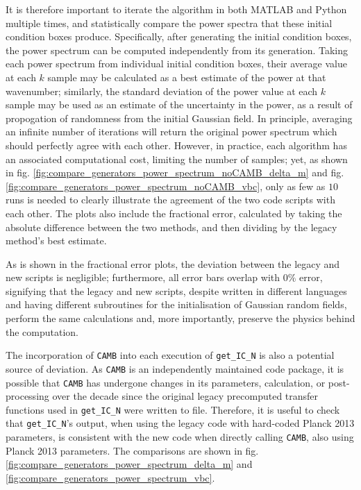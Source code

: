 \documentclass[floats,floatfix,showpacs,amssymb,prd,superscriptaddress,nofootinbib]{revtex4-2} %
\newcommand{\code}{\texttt}
\begin{document}
It is therefore important to iterate the algorithm in both MATLAB and Python multiple times, and statistically compare the power spectra that these initial condition boxes produce. Specifically, after generating the initial condition boxes, the power spectrum can be computed independently from its generation. Taking each power spectrum from individual initial condition boxes, their average value at each $k$ sample may be calculated as a best estimate of the power at that wavenumber; similarly, the standard deviation of the power value at each $k$ sample may be used as an estimate of the uncertainty in the power, as a result of propogation of randomness from the initial Gaussian field. In principle, averaging an infinite number of iterations will return the original power spectrum which should perfectly agree with each other. However, in practice, each algorithm has an associated computational cost, limiting the number of samples; yet, as shown in fig. \ref{fig:compare_generators_power_spectrum_noCAMB_delta_m} and fig. \ref{fig:compare_generators_power_spectrum_noCAMB_vbc}, only as few as $10$ runs is needed to clearly illustrate the agreement of the two code scripts with each other. The plots also include the fractional error, calculated by taking the absolute difference between the two methods, and then dividing by the legacy method's best estimate.

As is shown in the fractional error plots, the deviation between the legacy and new scripts is negligible; furthermore, all error bars overlap with $0 \%$ error, signifying that the legacy and new scripts, despite written in different languages and having different subroutines for the initialisation of Gaussian random fields, perform the same calculations and, more importantly, preserve the physics behind the computation.

The incorporation of \code{CAMB} into each execution of \code{get\_IC\_N} is also a potential source of deviation. As \code{CAMB} is an independently maintained code package, it is possible that \code{CAMB} has undergone changes in its parameters, calculation, or post-processing over the decade since the original legacy precomputed transfer functions used in \code{get\_IC\_N} were written to file. Therefore, it is useful to check that \code{get\_IC\_N}'s output, when using the legacy code with hard-coded Planck 2013 parameters, is consistent with the new code when directly calling \code{CAMB}, also using Planck 2013 parameters. The comparisons are shown in fig. \ref{fig:compare_generators_power_spectrum_delta_m} and \ref{fig:compare_generators_power_spectrum_vbc}.
\end{document}
